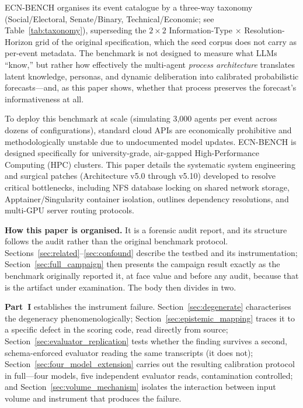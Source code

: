 \documentclass[11pt,journal,onecolumn]{IEEEtran}
\begin{document}
ECN-BENCH organises its event catalogue by a three-way taxonomy (Social/Electoral, Senate/Binary, Technical/Economic; see Table~\ref{tab:taxonomy}), superseding the $2\times2$ Information-Type $\times$ Resolution-Horizon grid of the original specification, which the seed corpus does not carry as per-event metadata. The benchmark is not designed to measure what LLMs ``know,'' but rather how effectively the multi-agent \emph{process architecture} translates latent knowledge, personas, and dynamic deliberation into calibrated probabilistic forecasts---and, as this paper shows, whether that process preserves the forecast's informativeness at all.

To deploy this benchmark at scale (simulating 3,000 agents per event across dozens of configurations), standard cloud APIs are economically prohibitive and methodologically unstable due to undocumented model updates. ECN-BENCH is designed specifically for university-grade, air-gapped High-Performance Computing (HPC) clusters. This paper details the systematic system engineering and surgical patches (Architecture v5.0 through v5.10) developed to resolve critical bottlenecks, including NFS database locking on shared network storage, Apptainer/Singularity container isolation, outlines dependency resolutions, and multi-GPU server routing protocols.

\textbf{How this paper is organised.} It is a forensic audit report, and its structure follows the audit rather than the original benchmark protocol. Sections~\ref{sec:related}--\ref{sec:confound} describe the testbed and its instrumentation; Section~\ref{sec:full_campaign} then presents the campaign result exactly as the benchmark originally reported it, at face value and before any audit, because that is the artifact under examination. The body then divides in two.

\textbf{Part~I} establishes the instrument failure. Section~\ref{sec:degenerate} characterises the degeneracy phenomenologically; Section~\ref{sec:epistemic_mapping} traces it to a specific defect in the scoring code, read directly from source; Section~\ref{sec:evaluator_replication} tests whether the finding survives a second, schema-enforced evaluator reading the same transcripts (it does not); Section~\ref{sec:four_model_extension} carries out the resulting calibration protocol in full---four models, five independent evaluator reads, contamination controlled; and Section~\ref{sec:volume_mechanism} isolates the interaction between input volume and instrument that produces the failure.
\end{document}
